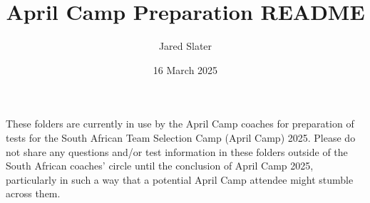 \documentclass[12pt]{article}
\title{April Camp Preparation README}
\author{Jared Slater}
\date{16 March 2025}
\begin{document}
\maketitle
\thispagestyle{empty}

These folders are currently in use by the April Camp coaches for preparation of tests for the South African Team Selection Camp (April Camp) 2025.
Please do not share any questions and/or test information in these folders outside of the South African coaches' circle until the conclusion of April Camp 2025, particularly in such a way that a potential April Camp attendee might stumble across them.
\end{document}
